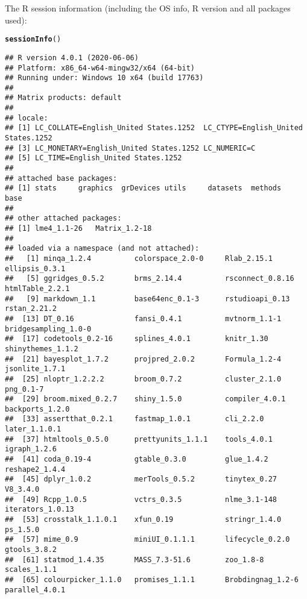 \documentclass{article}\usepackage[]{graphicx}\usepackage[]{color}
\makeatletter
\newcommand{\hlstd}[1]{\textcolor[rgb]{0.345,0.345,0.345}{#1}}%
\newcommand{\hlkwd}[1]{\textcolor[rgb]{0.737,0.353,0.396}{\textbf{#1}}}%
\newenvironment{kframe}{%
 \def\at@end@of@kframe{}%
 \ifinner\ifhmode%
  \def\at@end@of@kframe{\end{minipage}}%
  \begin{minipage}{\columnwidth}%
 \fi\fi%
 \def\FrameCommand##1{\hskip\@totalleftmargin \hskip-\fboxsep
 \colorbox{shadecolor}{##1}\hskip-\fboxsep
     \hskip-\linewidth \hskip-\@totalleftmargin \hskip\columnwidth}%
 \MakeFramed {\advance\hsize-\width
   \@totalleftmargin\z@ \linewidth\hsize
   \@setminipage}}%
 {\par\unskip\endMakeFramed%
 \at@end@of@kframe}
\newenvironment{knitrout}{}{} %
\makeatother
\begin{document}
The R session information (including the OS info, R version and all
packages used):

\begin{knitrout}
\color{fgcolor}\begin{kframe}
\begin{alltt}
\hlkwd{sessionInfo}\hlstd{()}
\end{alltt}
\begin{verbatim}
## R version 4.0.1 (2020-06-06)
## Platform: x86_64-w64-mingw32/x64 (64-bit)
## Running under: Windows 10 x64 (build 17763)
## 
## Matrix products: default
## 
## locale:
## [1] LC_COLLATE=English_United States.1252  LC_CTYPE=English_United States.1252   
## [3] LC_MONETARY=English_United States.1252 LC_NUMERIC=C                          
## [5] LC_TIME=English_United States.1252    
## 
## attached base packages:
## [1] stats     graphics  grDevices utils     datasets  methods   base     
## 
## other attached packages:
## [1] lme4_1.1-26   Matrix_1.2-18
## 
## loaded via a namespace (and not attached):
##   [1] minqa_1.2.4          colorspace_2.0-0     Rlab_2.15.1          ellipsis_0.3.1      
##   [5] ggridges_0.5.2       brms_2.14.4          rsconnect_0.8.16     htmlTable_2.2.1     
##   [9] markdown_1.1         base64enc_0.1-3      rstudioapi_0.13      rstan_2.21.2        
##  [13] DT_0.16              fansi_0.4.1          mvtnorm_1.1-1        bridgesampling_1.0-0
##  [17] codetools_0.2-16     splines_4.0.1        knitr_1.30           shinythemes_1.1.2   
##  [21] bayesplot_1.7.2      projpred_2.0.2       Formula_1.2-4        jsonlite_1.7.1      
##  [25] nloptr_1.2.2.2       broom_0.7.2          cluster_2.1.0        png_0.1-7           
##  [29] broom.mixed_0.2.7    shiny_1.5.0          compiler_4.0.1       backports_1.2.0     
##  [33] assertthat_0.2.1     fastmap_1.0.1        cli_2.2.0            later_1.1.0.1       
##  [37] htmltools_0.5.0      prettyunits_1.1.1    tools_4.0.1          igraph_1.2.6        
##  [41] coda_0.19-4          gtable_0.3.0         glue_1.4.2           reshape2_1.4.4      
##  [45] dplyr_1.0.2          merTools_0.5.2       tinytex_0.27         V8_3.4.0            
##  [49] Rcpp_1.0.5           vctrs_0.3.5          nlme_3.1-148         iterators_1.0.13    
##  [53] crosstalk_1.1.0.1    xfun_0.19            stringr_1.4.0        ps_1.5.0            
##  [57] mime_0.9             miniUI_0.1.1.1       lifecycle_0.2.0      gtools_3.8.2        
##  [61] statmod_1.4.35       MASS_7.3-51.6        zoo_1.8-8            scales_1.1.1        
##  [65] colourpicker_1.1.0   promises_1.1.1       Brobdingnag_1.2-6    parallel_4.0.1      

\end{verbatim}
\end{kframe}
\end{knitrout}
\end{document}
